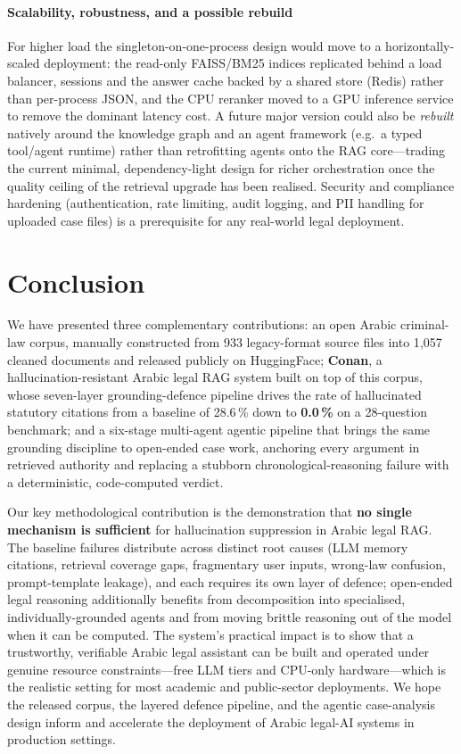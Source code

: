 \documentclass[final,1p,times]{elsarticle}
\begin{document}
\paragraph{Scalability, robustness, and a possible rebuild} For higher load the
singleton-on-one-process design would move to a horizontally-scaled deployment:
the read-only FAISS/BM25 indices replicated behind a load balancer, sessions and
the answer cache backed by a shared store (Redis) rather than per-process JSON,
and the CPU reranker moved to a GPU inference service to remove the dominant
latency cost. A future major version could also be \emph{rebuilt} natively around
the knowledge graph and an agent framework (e.g.\ a typed tool/agent runtime)
rather than retrofitting agents onto the RAG core---trading the current minimal,
dependency-light design for richer orchestration once the quality ceiling of the
retrieval upgrade has been realised. Security and compliance hardening
(authentication, rate limiting, audit logging, and PII handling for uploaded case
files) is a prerequisite for any real-world legal deployment.

\section{Conclusion}\label{sec:conclusion}

We have presented three complementary contributions: an open Arabic
criminal-law corpus, manually constructed from 933 legacy-format source
files into 1{,}057 cleaned documents and released publicly on HuggingFace;
\textbf{Conan}, a hallucination-resistant Arabic legal RAG system built on
top of this corpus, whose seven-layer grounding-defence pipeline drives the
rate of hallucinated statutory citations from a baseline of 28.6\,\% down to
\textbf{0.0\,\%} on a 28-question benchmark; and a six-stage multi-agent
agentic pipeline that brings the same grounding discipline to open-ended case
work, anchoring every argument in retrieved authority and replacing a stubborn
chronological-reasoning failure with a deterministic, code-computed verdict.

Our key methodological contribution is the demonstration that \textbf{no
single mechanism is sufficient} for hallucination suppression in Arabic legal
RAG. The baseline failures distribute across distinct root causes (LLM
memory citations, retrieval coverage gaps, fragmentary user inputs,
wrong-law confusion, prompt-template leakage), and each requires its own
layer of defence; open-ended legal reasoning additionally benefits from
decomposition into specialised, individually-grounded agents and from moving
brittle reasoning out of the model when it can be computed. The system's
practical impact is to show that a trustworthy, verifiable Arabic legal
assistant can be built and operated under genuine resource constraints---free
LLM tiers and CPU-only hardware---which is the realistic setting for most
academic and public-sector deployments. We hope the released corpus, the
layered defence pipeline, and the agentic case-analysis design inform and
accelerate the deployment of Arabic legal-AI systems in production settings.
\end{document}

